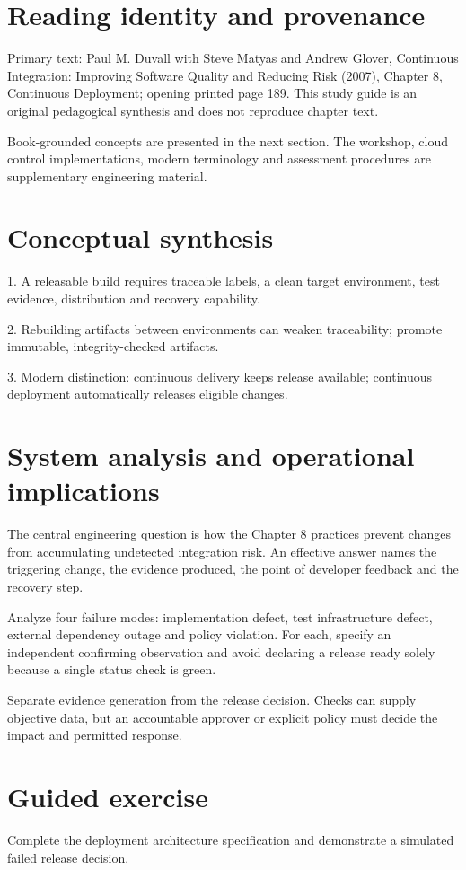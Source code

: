 \documentclass[11pt,letterpaper]{article}
\begin{document}
\makedoctitle
\makedocsummary
\tableofcontents
\clearpage
\section{Reading identity and provenance}
Primary text: Paul M. Duvall with Steve Matyas and Andrew Glover, Continuous Integration: Improving Software Quality and Reducing Risk (2007), Chapter 8, Continuous Deployment; opening printed page 189. This study guide is an original pedagogical synthesis and does not reproduce chapter text.

Book-grounded concepts are presented in the next section. The workshop, cloud control implementations, modern terminology and assessment procedures are supplementary engineering material.

\section{Conceptual synthesis}
1. A releasable build requires traceable labels, a clean target environment, test evidence, distribution and recovery capability.

2. Rebuilding artifacts between environments can weaken traceability; promote immutable, integrity-checked artifacts.

3. Modern distinction: continuous delivery keeps release available; continuous deployment automatically releases eligible changes.

\section{System analysis and operational implications}
The central engineering question is how the Chapter 8 practices prevent changes from accumulating undetected integration risk. An effective answer names the triggering change, the evidence produced, the point of developer feedback and the recovery step.

Analyze four failure modes: implementation defect, test infrastructure defect, external dependency outage and policy violation. For each, specify an independent confirming observation and avoid declaring a release ready solely because a single status check is green.

Separate evidence generation from the release decision. Checks can supply objective data, but an accountable approver or explicit policy must decide the impact and permitted response.

\section{Guided exercise}
Complete the deployment architecture specification and demonstrate a simulated failed release decision.
\end{document}
